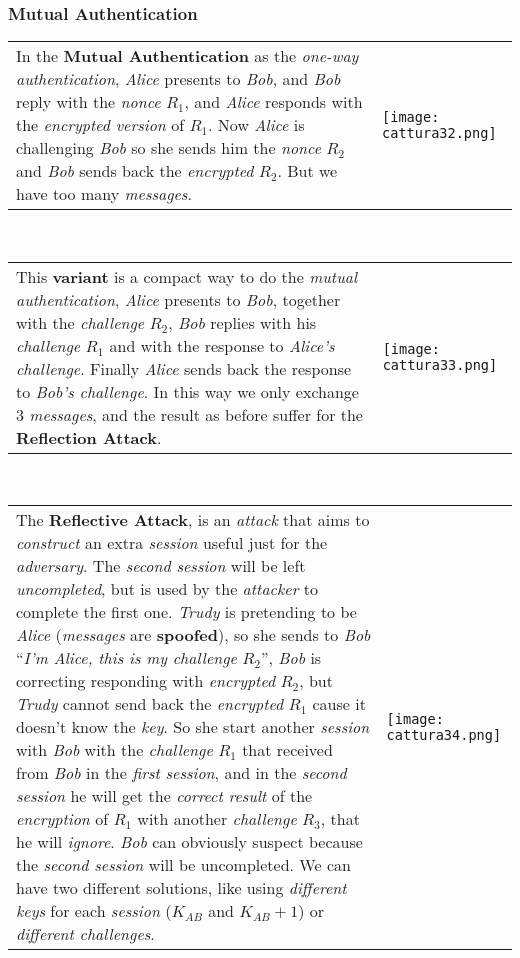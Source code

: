 \documentclass{article}
\begin{document}
\subsubsection{Mutual Authentication}
\begin{tabular}{C{11cm}  L{10.5cm}}
In the \textbf{Mutual Authentication} as the \emph{one-way authentication}, \emph{Alice} presents to \emph{Bob}, and \emph{Bob} reply with the \emph{nonce} $R_1$, and \emph{Alice} responds with the \emph{encrypted version} of $R_1$. Now \emph{Alice} is challenging \emph{Bob} so she sends him the \emph{nonce} $R_2$ and \emph{Bob} sends back the \emph{encrypted} $R_2$. But we have too many \emph{messages}. 
& \texttt{[image: cattura32.png]}
\end{tabular}
\hfill \break
\\
\begin{tabular}{C{11cm}  L{10.5cm}}
This \textbf{variant} is a compact way to do the \emph{mutual authentication}, \emph{Alice} presents to \emph{Bob}, together with the \emph{challenge} $R_2$, \emph{Bob} replies with his \emph{challenge} $R_1$ and with the response to \emph{Alice's challenge}. Finally \emph{Alice} sends back the response to \emph{Bob's challenge}. In this way we only exchange 3 \emph{messages}, and the result as before suffer for the \textbf{Reflection Attack}.
& \texttt{[image: cattura33.png]}
\end{tabular}
\hfill \break
\\
\begin{tabular}{C{11cm}  L{10.5cm}}
The \textbf{Reflective Attack}, is an \emph{attack} that aims to \emph{construct} an extra \emph{session} useful just for the \emph{adversary}. The \emph{second session} will be left \emph{uncompleted}, but is used by the \emph{attacker} to complete the first one. \emph{Trudy} is pretending to be \emph{Alice} (\emph{messages} are \textbf{spoofed}), so she sends to \emph{Bob} “\emph{I’m Alice, this is my challenge} $R_2$”, \emph{Bob} is correcting responding with \emph{encrypted} $R_2$, but \emph{Trudy} cannot send back the \emph{encrypted} $R_1$ cause it doesn't know the \emph{key}. So she start another \emph{session} with \emph{Bob} with the \emph{challenge} $R_1$ that received from \emph{Bob} in the \emph{first session}, and in the \emph{second session} he will get the \emph{correct result} of the \emph{encryption} of $R_1$ with another \emph{challenge} $R_3$, that he will \emph{ignore}. \emph{Bob} can obviously suspect because the \emph{second session} will be uncompleted. We can have two different solutions, like using \emph{different keys} for each \emph{session} ($K_{AB}$ and $K_{AB}+1$) or \emph{different challenges}.
& \texttt{[image: cattura34.png]}
\end{tabular}
\end{document}
